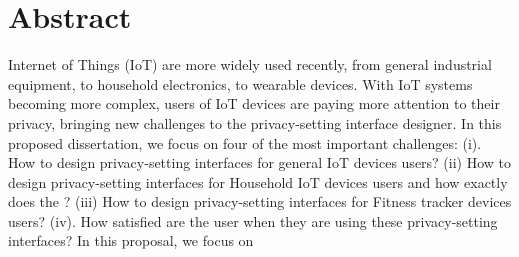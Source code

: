 \chapter*{Abstract}
Internet of Things (IoT) are more widely used recently, from general industrial equipment, to household electronics, to wearable devices. With IoT systems becoming more complex, users of IoT devices are paying more attention to their privacy, bringing new challenges to the privacy-setting interface designer. In this proposed dissertation, we focus on four of the most important challenges: (i). How to design privacy-setting interfaces for general IoT devices users? (ii) How to design privacy-setting interfaces for Household IoT devices users and how exactly does the ? (iii) How to design privacy-setting interfaces for Fitness tracker devices users? (iv). How satisfied are the user when they are using these privacy-setting interfaces? In this proposal, we focus on 

